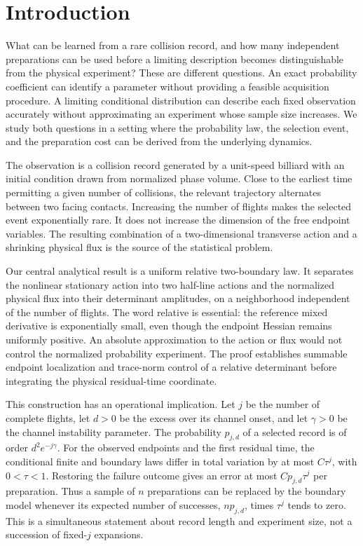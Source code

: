 \section{Introduction}
\label{sec:v7-introduction}
What can be learned from a rare collision record, and how many independent preparations can be used before a limiting description becomes distinguishable from the physical experiment? These are different questions. An exact probability coefficient can identify a parameter without providing a feasible acquisition procedure. A limiting conditional distribution can describe each fixed observation accurately without approximating an experiment whose sample size increases. We study both questions in a setting where the probability law, the selection event, and the preparation cost can be derived from the underlying dynamics.

The observation is a collision record generated by a unit-speed billiard with an initial condition drawn from normalized phase volume. Close to the earliest time permitting a given number of collisions, the relevant trajectory alternates between two facing contacts. Increasing the number of flights makes the selected event exponentially rare. It does not increase the dimension of the free endpoint variables. The resulting combination of a two-dimensional transverse action and a shrinking physical flux is the source of the statistical problem.

Our central analytical result is a uniform relative two-boundary law. It separates the nonlinear stationary action into two half-line actions and the normalized physical flux into their determinant amplitudes, on a neighborhood independent of the number of flights. The word relative is essential: the reference mixed derivative is exponentially small, even though the endpoint Hessian remains uniformly positive. An absolute approximation to the action or flux would not control the normalized probability experiment. The proof establishes summable endpoint localization and trace-norm control of a relative determinant before integrating the physical residual-time coordinate.

This construction has an operational implication. Let $j$ be the number of complete flights, let $d>0$ be the excess over its channel onset, and let $\gamma>0$ be the channel instability parameter. The probability $p_{j,d}$ of a selected record is of order $d^2e^{-j\gamma}$. For the observed endpoints and the first residual time, the conditional finite and boundary laws differ in total variation by at most $C\tau^j$, with $0<\tau<1$. Restoring the failure outcome gives an error at most $Cp_{j,d}\tau^j$ per preparation. Thus a sample of $n$ preparations can be replaced by the boundary model whenever its expected number of successes, $np_{j,d}$, times $\tau^j$ tends to zero. This is a simultaneous statement about record length and experiment size, not a succession of fixed-$j$ expansions.

